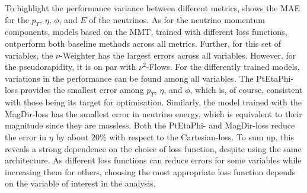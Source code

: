 To highlight the performance variance between different metrics,  shows the MAE for the $p_T$, $\eta$, $\phi$, and $E$ of the neutrinos.
As for the neutrino momentum components, models based on the MMT, trained with different loss functions, outperform both baseline methods across all metrics. Further, for this set of variables, the $\nu$-Weighter has the largest errors across all variables. However, for the pseudorapidity, it is on par with $\nu^2$-Flows. For the differently trained models, variations in the performance can be found among all variables. The PtEtaPhi-loss provides the smallest error among $p_T$, $\eta$, and $\phi$, which is, of course, consistent with those being its target for optimisation.
Similarly, the model trained with the MagDir-loss has the smallest error in neutrino energy, which is equivalent to their magnitude since they are massless. Both the PtEtaPhi- and MagDir-loss reduce the error in $\eta$ by about $20\%$ with respect to the Cartesian-loss. To sum up, this reveals a strong dependence on the choice of loss function, despite using the same architecture. As different loss functions can reduce errors for some variables while increasing them for others, choosing the most appropriate loss function depends on the variable of interest in the analysis.

